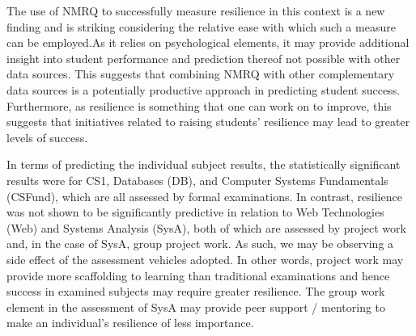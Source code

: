 \documentclass[sigconf]{acmart}
\begin{document}

The use of NMRQ to successfully measure resilience in this context is a new finding and is striking considering the relative ease with which such a measure can be employed.As it relies on psychological elements, it may provide additional insight into student performance and prediction thereof not possible with other data sources. This suggests that combining NMRQ with other complementary data sources is a potentially productive approach in predicting student success. Furthermore, as resilience is something that one can work on to improve, this suggests that initiatives related to raising students' resilience may lead to greater levels of success. 



In terms of predicting the individual subject results, the statistically significant results were for CS1, Databases (DB), and Computer Systems Fundamentals (CSFund), which are all assessed by formal examinations. In contrast, resilience was not shown to be significantly predictive in relation to Web Technologies (Web) and Systems Analysis (SysA), both of which are assessed by project work and, in the case of SysA, group project work. As such, we may be observing a side effect of the assessment vehicles adopted. In other words, project work may provide more scaffolding to learning than traditional examinations and hence success in examined subjects may require greater resilience. The group work element in the assessment of SysA may provide peer support / mentoring to make an individual's resilience of less importance.    
\end{document}

